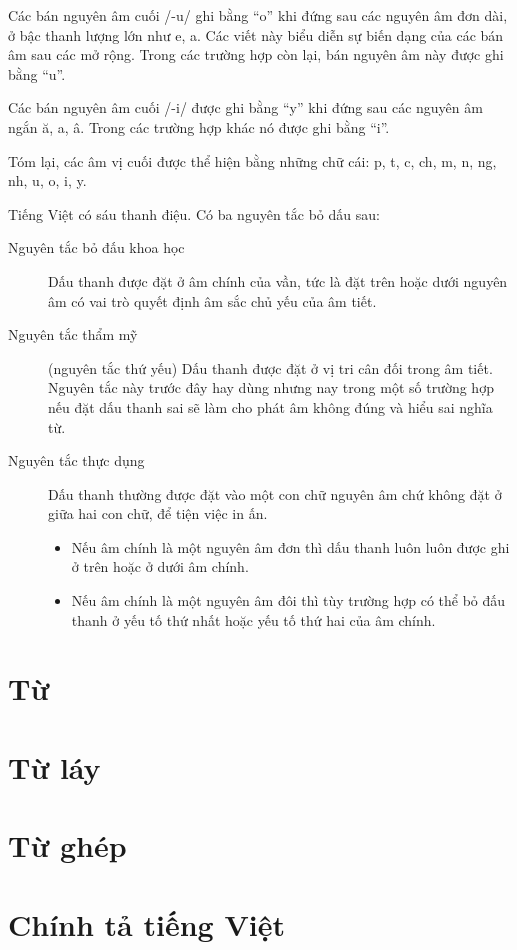 \documentclass[a4paper,oneside]{book} %
\theoremstyle{break}
\begin{document}
Các bán nguyên âm cuối /-u/ ghi bằng ``o'' khi đứng sau các nguyên âm đơn
dài, ở bậc thanh lượng lớn như e, a. Các viết này biểu diễn sự biến
dạng của các bán âm sau các mở rộng. Trong các trường hợp còn lại, bán
nguyên âm này được ghi bằng ``u''.

Các bán nguyên âm cuối /-i/ được ghi bằng ``y'' khi đứng sau các
nguyên âm ngắn ă, a, â. Trong các trường hợp khác nó được ghi bằng
``i''.

Tóm lại, các âm vị cuối được thể hiện bằng những chữ cái: p, t, c, ch,
m, n, ng, nh, u, o, i, y.

Tiếng Việt có sáu thanh điệu. Có ba nguyên tắc bỏ dấu sau:
\begin{description}
\item[Nguyên tắc bỏ đấu khoa học] Dấu thanh được đặt ở âm chính của
  vần, tức là đặt trên hoặc dưới nguyên âm có vai trò quyết định âm
  sắc chủ yếu của âm tiết.
\item[Nguyên tắc thẩm mỹ] (nguyên tắc thứ yếu) Dấu thanh được đặt ở vị
  tri cân đối trong âm tiết. Nguyên tắc này trước đây hay dùng nhưng
  nay trong một số trường hợp nếu đặt dấu thanh sai sẽ làm cho phát âm
  không đúng và hiểu sai nghĩa từ.
\item[Nguyên tắc thực dụng] Dấu thanh thường được đặt vào một con chữ
  nguyên âm chứ không đặt ở giữa hai con chữ, để tiện việc in ấn.
  \begin{itemize}
  \item Nếu âm chính là một nguyên âm đơn thì dấu thanh luôn luôn được
  ghi ở trên hoặc ở dưới âm chính.
  \item Nếu âm chính là một nguyên âm đôi thì tùy trường hợp có thể bỏ
  đấu thanh ở yếu tố thứ nhất hoặc yếu tố thứ hai của âm chính.
  \end{itemize}
\end{description}

\section{Từ}


\section{Từ láy}


\section{Từ ghép}


\section{Chính tả tiếng Việt}
\end{document}
